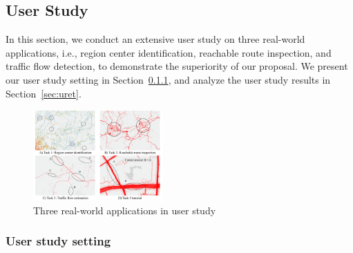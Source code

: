 \subsection{User Study}\label{sec:user}
In this section, we conduct an extensive user study on three real-world applications, i.e., region center identification, reachable route inspection, and traffic flow detection, to demonstrate the superiority of our proposal.
We present our user study setting in Section~\ref{sec:uset}, and analyze the user study results in Section~\ref{sec:uret}.



\begin{figure}[t]
	\centering
	\includegraphics[width=0.44\textwidth]{pictures/user_study/interface.pdf}
	\vspace{-3mm}
	\caption{Three real-world applications in user study}
	\label{fig:apps}
	\vspace{-6mm}
\end{figure}

\subsubsection{User study setting}\label{sec:uset}



